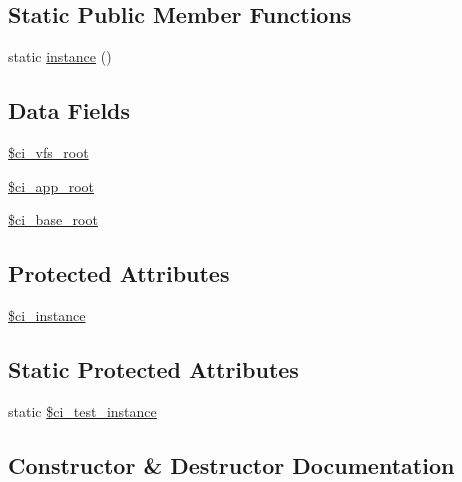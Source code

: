 \subsection*{Static Public Member Functions}
\begin{DoxyCompactItemize}
\item 
static \hyperlink{class_c_i___test_case_a0deb004950b8dc4f51836316fd19c111}{instance} ()
\end{DoxyCompactItemize}
\subsection*{Data Fields}
\begin{DoxyCompactItemize}
\item 
\hyperlink{class_c_i___test_case_a5cc3c10d43e82ad7c4227a2ba74d81a1}{\$ci\+\_\+vfs\+\_\+root}
\item 
\hyperlink{class_c_i___test_case_a00fb66def96526d54c95cb35c4fd2483}{\$ci\+\_\+app\+\_\+root}
\item 
\hyperlink{class_c_i___test_case_af7581cbf8e1a3087c6501772c72f44e2}{\$ci\+\_\+base\+\_\+root}
\end{DoxyCompactItemize}
\subsection*{Protected Attributes}
\begin{DoxyCompactItemize}
\item 
\hyperlink{class_c_i___test_case_aee2f7f6caf8c8b7f4bdf0a5788e795f8}{\$ci\+\_\+instance}
\end{DoxyCompactItemize}
\subsection*{Static Protected Attributes}
\begin{DoxyCompactItemize}
\item 
static \hyperlink{class_c_i___test_case_abd33ad74f11902c8e804d62e27136aa2}{\$ci\+\_\+test\+\_\+instance}
\end{DoxyCompactItemize}


\subsection{Constructor \& Destructor Documentation}
\hypertarget{class_c_i___test_case_a095c5d389db211932136b53f25f39685}{}
